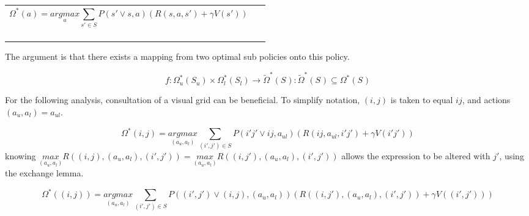 \documentclass{article}
\begin{document}
\begin{flushleft}
\tablefirsthead{}
\tablehead{}
\tabletail{}
\tablelasttail{}
\begin{supertabular}{m{15.493cm}m{0.996cm}}
\begin{equation}
\Omega _{}^{\ast }(a)=\underset a{\mathit{argmax}}\sum _{s'{\in}S}^{}P\left(s'\vee s,a\right)\left(R\left(s,a,s'\right)+\mathit{\gamma V}\left(s'\right)\right)
\end{equation}
~
 &
~
\\
\end{supertabular}
\end{flushleft}
The argument is that there exists a mapping from two optimal sub policies onto this policy. 

\begin{equation}
f:\Omega _u^{\ast }\left(S_u\right)\times \Omega _l^{\ast }\left(S_l\right)\rightarrow \widetilde{\Omega }_{}^{\ast }\left(S_{}\right):\widetilde{\Omega }_{}^{\ast }\left(S_{}\right){\subseteq}\Omega _{}^{\ast }\left(S_{}\right)
\end{equation}

\bigskip

For the following analysis, consultation of a visual grid can be beneficial. To simplify notation,  $\left(i,j\right)$ is taken to equal  $\mathit{ij}$, and actions  $\left(a_u,a_l\right)=a_{\mathit{ul}}$.


\bigskip

\begin{equation}
\Omega _{}^{\ast }(i,j)=\underset{\left(a_u,a_l\right)}{\mathit{argmax}}\sum _{\left(i',j'\right){\in}S}^{}P\left(i'j'\vee \mathit{ij},a_{\mathit{ul}}\right)\left(R\left(\mathit{ij},a_{\mathit{ul}},i'j'\right)+\mathit{\gamma V}\left(i'j'\right)\right)
\end{equation}
knowing  $\underset{\left(a_u,a_l\right)}{\mathit{max}}R\left(\left(i,j\right),\left(a_u,a_l\right),\left(i',j'\right)\right)=\underset{\left(a_u,a_l\right)}{\mathit{max}}R\left(\left(i,j'\right),\left(a_u,a_l\right),\left(i',j'\right)\right)$ allows the expression to be altered with  $j'$, using the exchange lemma.

\begin{equation}
\Omega _{}^{\ast }(\left(i,j\right))=\underset{\left(a_u,a_l\right)}{\mathit{argmax}}\sum _{\left(i',j'\right){\in}S}^{}P\left(\left(i',j'\right)\vee \left(i,j\right),\left(a_u,a_l\right)\right)\left(R\left(\left(i,j'\right),\left(a_u,a_l\right),\left(i',j'\right)\right)+\mathit{\gamma V}\left(\left(i',j'\right)\right)\right)
\end{equation}
\end{document}
